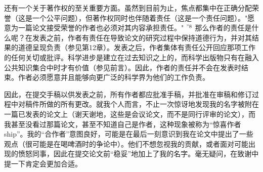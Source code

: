 还有一个关于著作权的至关重要方面。虽然到目前为止，焦点都集中在正确分配荣誉（这是一个公平问题），但著作权同时也伴随着责任（这是一个责任问题）。"愿意为一篇论文接受荣誉的作者也必须对其内容承担责任。" ${ }^{" 8}$ 那么作者的责任是什么呢？在发表之前，作者有责任在导致论文的研究过程中保持道德行为，并对其结果的道德呈现负责（参见第12章）。发表之后，作者集体有责任公开回应那项工作的任何关切或批评。科学进步是建立在过去知识之上的，而科学出版物只有在融入公共知识集合中时才有价值（参见前言）。因此，作者的责任并不会在发表时结束。作者必须愿意并且能够向更广泛的科学界为他们的工作负责。

因此，在提交手稿以供发表之前，所有作者都应批准手稿，并批准在审稿和修订过程中对稿件所做的所有更改。就我个人而言，不止一次惊讶地发现我的名字被附在一篇已发表的论文上（谢天谢地，这些是会议论文，而不是同行评审的论文），而我甚至没看过那篇论文，甚至不知道自己是作者，这种现象被称为“惊喜作者ship”。我的“合作者”意图良好，可能是在最后一刻意识到我在论文中提出了一些观点（很可能是在喝啤酒时的争论中）。他们不想忽视我的贡献，或者面对可能出现的愤怒同事，因此在提交论文前“稳妥”地加上了我的名字。毫无疑问，在致谢中提一下肯定会更加合适。

